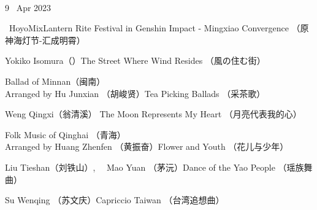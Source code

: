 \documentclass[letter,6pt,poets]{ConcProg}
\begin{document}
\begin{spacing}{1.0}
\begin{programme}{
\\  {\normalsize 9 ~Apr 2023}
}
\begin{part}[]
    \begin{composition}{\ HoyoMix}{}{Lantern Rite Festival in Genshin Impact - Mingxiao Convergence （原神海灯节-汇成明霄）}{}      
    \end{composition} 
    
     \begin{composition}{Yokiko Isomura（）}{}{The Street Where Wind Resides （風の住む街）}{}      
    \end{composition} 
    
     \begin{composition}{Ballad of Minnan（闽南）\\ Arranged by Hu Junxian （胡峻贤）}{}{Tea Picking Ballads （采茶歌）}{}      
    \end{composition} 
    
    \begin{composition}{Weng Qingxi（翁清溪） }{}{The Moon Represents My Heart （月亮代表我的心）}{}      
    \end{composition} 
    
    \begin{composition}{Folk Music of Qinghai	（青海） \\ Arranged by Huang Zhenfen （黄振奋）}{}{Flower and Youth （花儿与少年） }{}      
    \end{composition} 
    
    \begin{composition}{Liu Tieshan（刘铁山）, \ \ Mao Yuan （茅沅）}{}{Dance of the Yao People （瑶族舞曲）}{}      
    \end{composition} 
    
     \begin{composition}{Su Wenqing （苏文庆）}{}{Capriccio Taiwan （台湾追想曲）}{}      
    \end{composition} 
    
    
    
    
    
    
    
    
   
    
  
  \end{part}
  
  
\end{programme}


\end{spacing}
\end{document}
